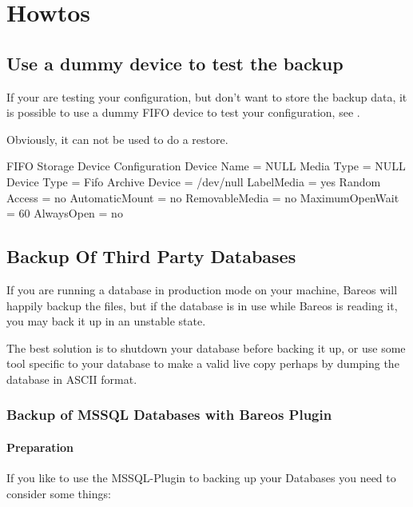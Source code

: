 \chapter{Howtos}

\section{Use a dummy device to test the backup}
\label{dummydevice}
\label{TestUsingFifoDevice}
If your are testing your configuration, but don't want to store the backup data,
it is possible to use a dummy FIFO device to test your configuration, see .

Obviously, it can not be used to do a restore.

\begin{bconfig}{FIFO Storage Device Configuration}
Device {
  Name = NULL
  Media Type = NULL
  Device Type = Fifo
  Archive Device = /dev/null
  LabelMedia = yes
  Random Access = no
  AutomaticMount = no
  RemovableMedia = no
  MaximumOpenWait = 60
  AlwaysOpen = no
}
\end{bconfig}



\section{Backup Of Third Party Databases}
\label{BackupOtherDBs}

If you are running a database in production mode on your machine, Bareos will
happily backup the files, but if the database is in use while Bareos is
reading it, you may back it up in an unstable state.

The best solution is to shutdown your database before backing it up, or use
some tool specific to your database to make a valid live copy perhaps by
dumping the database in ASCII format.

\subsection{Backup of MSSQL Databases with Bareos Plugin}
\label{MSSQL}


\subsubsection {Preparation}
If you like to use the MSSQL-Plugin to backing up your Databases you need to consider some things:

